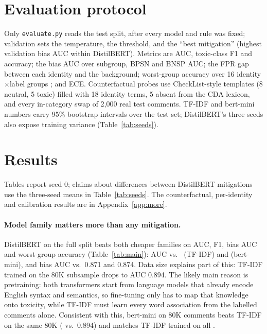 \section{Evaluation protocol}
\label{sec:protocol}
Only \texttt{evaluate.py} reads the test split, after every model and rule was fixed; validation sets the temperature,
the threshold, and the ``best mitigation'' (highest validation bias AUC within DistilBERT). Metrics are AUC, toxic-class
F1 and accuracy; the \citet{borkan2019nuanced} bias AUC over subgroup, BPSN and BNSP AUC; the FPR gap between each
identity and the background; worst-group accuracy over 16 identity$\times$label groups \citep{koh2021wilds}; and ECE.
Counterfactual probes use CheckList-style \citep{ribeiro2020beyond} templates (8 neutral, 5 toxic) filled with 18
identity terms, 5 absent from the CDA lexicon, and every in-category swap of 2{,}000 real test comments. TF-IDF and bert-mini numbers carry 95\%
bootstrap intervals over the test set; DistilBERT's three seeds also expose training variance (Table~\ref{tab:seeds}).

\section{Results}

Tables report seed 0; claims about differences between DistilBERT mitigations use the three-seed means in
Table~\ref{tab:seeds}. The counterfactual, per-identity and calibration results are in Appendix~\ref{app:more}.

\paragraph{Model family matters more than any mitigation.} DistilBERT on the full split beats both cheaper families on
AUC, F1, bias AUC and worst-group accuracy (Table~\ref{tab:main}): AUC \BertDistilErmAuc{} vs.\ \TfidfErmAuc{}
(TF-IDF) and \BertErmAuc{} (bert-mini), and bias AUC \BertDistilErmBiasAuc{} vs.\ 0.871 and 0.874. Data size explains
part of this: TF-IDF trained on the 80K subsample drops to AUC 0.894. The likely main reason is pretraining: both
transformers start from language models that already encode English syntax and semantics, so fine-tuning only has to
map that knowledge onto toxicity, while TF-IDF must learn every word association from the labelled comments alone.
Consistent with this, bert-mini on 80K comments beats TF-IDF on the same 80K (\BertErmAuc{} vs.\ 0.894) and matches
TF-IDF trained on all \NTrain{}.

